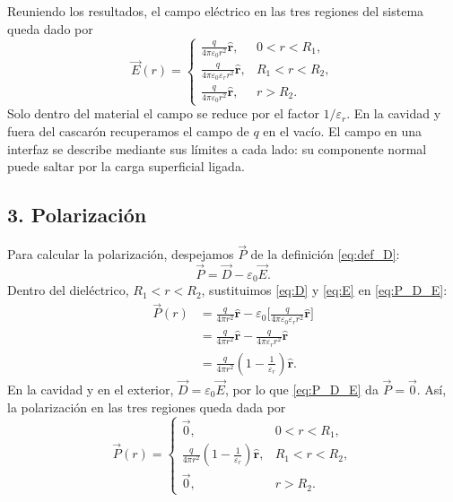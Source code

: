 \documentclass[11pt]{article}
\newcommand{\er}{\hat{\mathbf r}}
\begin{document}
Reuniendo los resultados, el campo eléctrico en las tres regiones
del sistema queda dado por
\begin{equation}
\boxed{
\vec E(r)=
\begin{cases}
  \displaystyle
  \frac{q}{4\pi\varepsilon_0r^2}\er,
    &0<r<R_1,\\[7pt]
  \displaystyle
  \frac{q}{4\pi\varepsilon_0\varepsilon_r r^2}\er,
    &R_1<r<R_2,\\[7pt]
  \displaystyle
  \frac{q}{4\pi\varepsilon_0r^2}\er,
    &r>R_2.
\end{cases}
}
\label{eq:E}
\end{equation}
Solo dentro del material el campo se reduce por el factor
$1/\varepsilon_r$. En la cavidad y fuera del cascarón recuperamos el
campo de $q$ en el vacío. El campo en una interfaz se describe mediante
sus límites a cada lado: su componente normal puede saltar por la carga
superficial ligada.

\subsection*{3. Polarización}

Para calcular la polarización, despejamos $\vec P$ de la
definición \eqref{eq:def_D}:
\begin{equation}
  \vec P=\vec D-\varepsilon_0\vec E.
  \label{eq:P_D_E}
\end{equation}
Dentro del dieléctrico, $R_1<r<R_2$, sustituimos
\eqref{eq:D} y \eqref{eq:E} en \eqref{eq:P_D_E}:
\begin{align*}
  \vec P(r)
    &=\frac{q}{4\pi r^2}\er
      -\varepsilon_0
      \Biggl[
        \frac{q}{4\pi\varepsilon_0\varepsilon_r r^2}\er
      \Biggr]\\[5pt]
    &=\frac{q}{4\pi r^2}\er
      -\frac{q}{4\pi\varepsilon_r r^2}\er\\[5pt]
    &=\frac{q}{4\pi r^2}
      \left(1-\frac{1}{\varepsilon_r}\right)\er.
\end{align*}
En la cavidad y en el exterior, $\vec D=\varepsilon_0\vec E$,
por lo que \eqref{eq:P_D_E} da $\vec P=\vec0$.
Así, la polarización en las tres regiones queda dada por
\begin{equation}
\boxed{
\vec P(r)=
\begin{cases}
  \vec0,
    &0<r<R_1,\\[5pt]
  \displaystyle
  \frac{q}{4\pi r^2}
  \left(1-\frac{1}{\varepsilon_r}\right)\er,
    &R_1<r<R_2,\\[7pt]
  \vec0,
    &r>R_2.
\end{cases}
}
\label{eq:P}
\end{equation}
\end{document}
